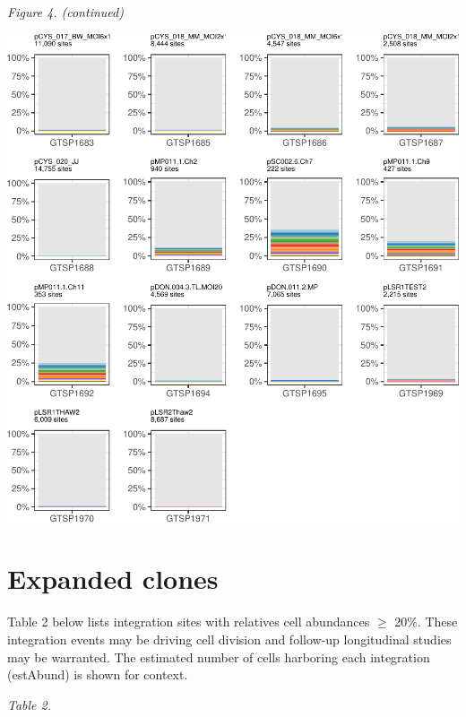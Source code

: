 \documentclass[12pt,]{article}
\begin{document}
\emph{Figure 4. (continued)}

\includegraphics{project_files/figure-latex/fig4cont-1.pdf}

\newpage

\section{Expanded clones}\label{expanded-clones}

Table 2 below lists integration sites with relatives cell abundances
\(\geq\) 20\%. These integration events may be driving cell division and
follow-up longitudinal studies may be warranted. The estimated number of
cells harboring each integration (estAbund) is shown for context.

\emph{Table 2.}
\end{document}
